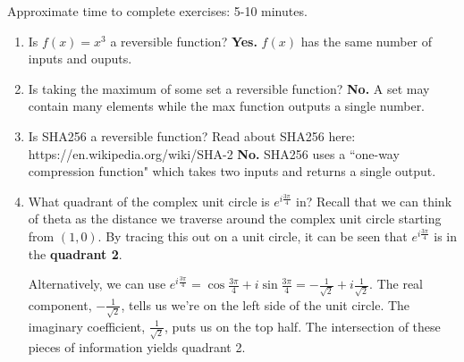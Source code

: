 

Approximate time to complete exercises: 5-10 minutes.

\begin{enumerate}[font=\bfseries]
    \item Is $f(x) = x^3$ a reversible function?\newline
    \textbf{Yes.} $f(x)$ has the same number of inputs and ouputs.
    \item Is taking the maximum of some set a reversible function?\newline
    \textbf{No.} A set may contain many elements while the max function outputs a single number.
    \item Is SHA256 a reversible function? Read about SHA256 here: https://en.wikipedia.org/wiki/SHA-2\newline
    \textbf{No.} SHA256 uses a ``one-way compression function" which takes two inputs and returns a single output.
    \item What quadrant of the complex unit circle is $e^{i\frac{3\pi}{4}}$ in?\newline
    Recall that we can think of theta as the distance we traverse around the complex unit circle starting from $(1,0)$. By tracing this out on a unit circle, it can be seen that $e^{i\frac{3\pi}{4}}$ is in the \textbf{quadrant 2}.\newline
    
    Alternatively, we can use $e^{i\frac{3\pi}{4}} = \cos{\frac{3\pi}{4}}+i\sin{\frac{3\pi}{4}} = -\frac{1}{\sqrt{2}}+i\frac{1}{\sqrt{2}}$.
    The real component, $-\frac{1}{\sqrt{2}}$, tells us we're on the left side of the unit circle. The imaginary coefficient, $\frac{1}{\sqrt{2}}$, puts us on the top half. The intersection of these pieces of information yields quadrant 2.
    
    
\end{enumerate}




